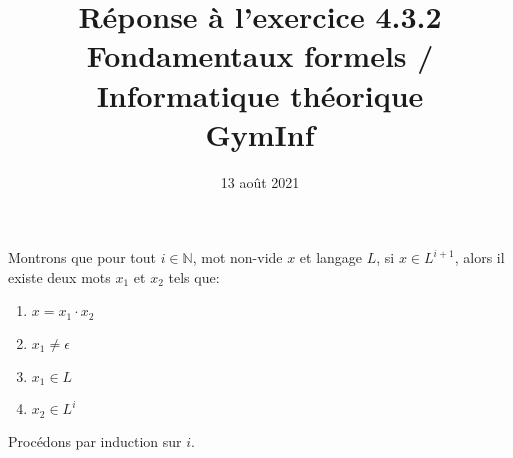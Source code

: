 \documentclass[12pt,french,a4paper]{article}
\begin{document}
\title{\vspace{-2cm}Réponse à l'exercice 4.3.2\\\large{Fondamentaux formels / Informatique théorique\\GymInf}}
\date{\vspace{-1cm}13 août 2021}

\maketitle

Montrons que pour tout $i \in \mathbb{N}$, mot non-vide $x$ et langage $L$, si $x \in L^{i+1}$, alors il existe deux mots $x_1$ et $x_2$ tels que:
\begin{enumerate}
\item $x = x_1 \cdot x_2$
\item $x_1 \neq \epsilon$
\item $x_1 \in L$
\item $x_2 \in L^i$
\end{enumerate}
Procédons par induction sur $i$.
\end{document}
